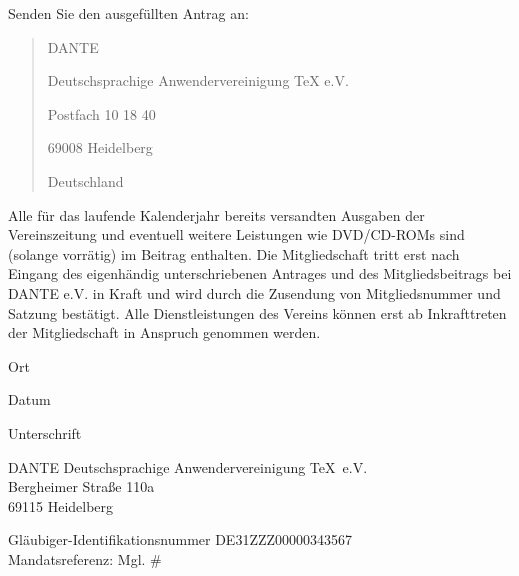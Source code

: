 \documentclass[ngerman]{article}
\begin{document}
Senden Sie den ausgefüllten Antrag an:
\begin{quote}
DANTE

Deutschsprachige Anwendervereinigung \TeX{} e.V.

Postfach 10 18 40

69008 Heidelberg

Deutschland
\end{quote}
Alle für das laufende Kalenderjahr bereits versandten Ausgaben der Vereinszeitung und eventuell weitere Leistungen
wie DVD/CD-ROMs sind (solange vorrätig) im Beitrag enthalten. Die Mitgliedschaft tritt erst nach Eingang des
eigenhändig unterschriebenen Antrages und des Mitgliedsbeitrags bei DANTE e.V. in Kraft und wird durch die Zusendung
von Mitgliedsnummer und Satzung bestätigt. Alle Dienstleistungen des Vereins können erst ab Inkrafttreten
der Mitgliedschaft in Anspruch genommen werden.

\vspace{22pt}

\begin{minipage}{0.2\textwidth}
\begin{center}
\dotfill

Ort
\end{center}
\end{minipage}\hfill
\begin{minipage}{0.15\textwidth}
\begin{center}
\dotfill

Datum
\end{center}
\end{minipage}\hfill
\begin{minipage}{0.5\textwidth}
\begin{center}
\dotfill

Unterschrift
\end{center}
\end{minipage}


\newpage

\renewcommand\thesubsection{\arabic{subsection}.}

\begin{flushright}
{\Huge DANTE} \hfill Deutschsprachige Anwendervereinigung \TeX\ e.V.\\
Bergheimer Straße 110a\\
69115 Heidelberg
\end{flushright}

\bigskip
Gläubiger-Identifikationsnummer DE31ZZZ00000343567\\[5pt]
Mandatsreferenz: Mgl. \# %
\\[1cm]
\end{document}
